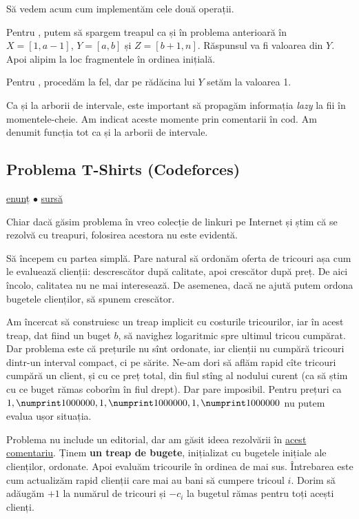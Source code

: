 \documentclass[../main.tex]{subfiles}
\begin{document}
Să vedem acum cum implementăm cele două operații.

Pentru , putem să spargem treapul ca și în problema anterioară în $X = [1, a-1]$, $Y = [a, b]$ și $Z = [b + 1, n]$. Răspunsul va fi valoarea  din $Y$. Apoi alipim la loc fragmentele în ordinea inițială.

Pentru , procedăm la fel, dar pe rădăcina lui $Y$ setăm  la valoarea 1.

Ca și la arborii de intervale, este important să propagăm informația \textit{lazy} la fii în momentele-cheie. Am indicat aceste momente prin comentarii în cod. Am denumit funcția tot  ca și la arborii de intervale.

\subsection{Problema T-Shirts (Codeforces)}
\label{problem:t-shirts}

\href{https://codeforces.com/contest/702/problem/F}{enunț}
$\bullet$
\hyperref[code:t-shirts]{sursă}

Chiar dacă găsim problema în vreo colecție de linkuri pe Internet și știm că se rezolvă cu treapuri, folosirea acestora nu este evidentă.

Să începem cu partea simplă. Pare natural să ordonăm oferta de tricouri așa cum le evaluează clienții: descrescător după calitate, apoi crescător după preț. De aici încolo, calitatea nu ne mai interesează. De asemenea, dacă ne ajută putem ordona bugetele clienților, să spunem crescător.

Am încercat să construiesc un treap implicit cu costurile tricourilor, iar în acest treap, dat fiind un buget $b$, să navighez logaritmic spre ultimul tricou cumpărat. Dar problema este că prețurile nu sînt ordonate, iar clienții nu cumpără tricouri dintr-un interval compact, ci pe sărite. Ne-am dori să aflăm rapid cîte tricouri cumpără un client, și cu ce preț total, din fiul stîng al nodului curent (ca să știm cu ce buget rămas coborîm în fiul drept). Dar pare imposibil. Pentru prețuri ca $1, \np{1000000}, 1, \np{1000000}, 1, \np{1000000}$ nu putem evalua ușor situația.

Problema nu include un editorial, dar am găsit ideea rezolvării în \href{https://codeforces.com/blog/entry/46324#comment-307625}{acest comentariu}. Ținem \textbf{un treap de bugete}, inițializat cu bugetele inițiale ale clienților, ordonate. Apoi evaluăm tricourile în ordinea de mai sus. Întrebarea este cum actualizăm rapid clienții care mai au bani să cumpere tricoul $i$. Dorim să adăugăm $+1$ la numărul de tricouri și $-c_i$ la bugetul rămas pentru toți acești clienți.
\end{document}
